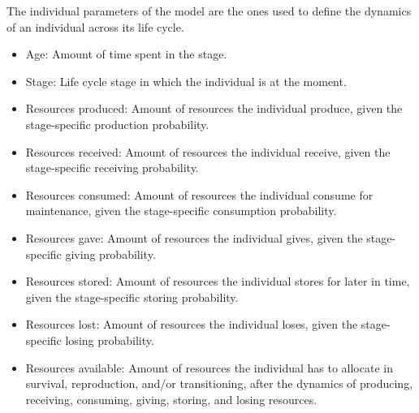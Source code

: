 \documentclass{article}
\begin{document}
The individual parameters of the model are the ones used to define the dynamics of an individual across its life cycle.

\begin{itemize}
    \item Age: Amount of time spent in the stage.
    \item Stage: Life cycle stage in which the individual is at the moment.
    \item Resources produced: Amount of resources the individual produce, given the stage-specific production probability.
    \item Resources received: Amount of resources the individual receive, given the stage-specific receiving probability.
    \item Resources consumed: Amount of resources the individual consume for maintenance, given the stage-specific consumption probability.
    \item Resources gave: Amount of resources the individual gives, given the stage-specific giving probability.
    \item Resources stored: Amount of resources the individual stores for later in time, given the stage-specific storing probability.
    \item Resources lost: Amount of resources the individual loses, given the stage-specific losing probability.
    \item Resources available: Amount of resources the individual has to allocate in survival, reproduction, and/or transitioning, after the dynamics of producing, receiving, consuming, giving, storing, and losing resources.
\end{itemize}
\end{document}
